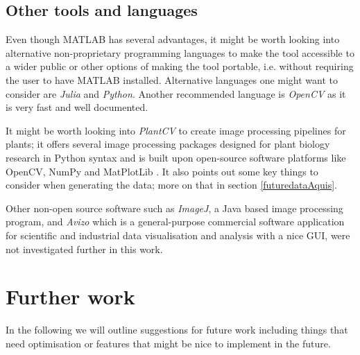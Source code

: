 

\subsection{Other tools and languages}

Even though MATLAB has several advantages, it might be worth looking into alternative non-proprietary programming languages to make the tool accessible to a wider public or other options of making the tool portable, i.e. without requiring the user to have MATLAB installed.
Alternative languages one might want to consider are \textit{Julia} and \textit{Python}. Another recommended language is \textit{OpenCV} as it is very fast and well documented.

It might be worth looking into \textit{PlantCV} to create image processing pipelines for plants; it offers several image processing packages designed for plant biology research in Python syntax and is built upon open-source software platforms like OpenCV, NumPy and MatPlotLib \cite{plantCV}. It also points out some key things to consider when generating the data; more on that in section \ref{futuredataAquis}.

Other non-open source software such as \textit{ImageJ}, a Java based image processing program, and \textit{Avizo} which is a general-purpose commercial software application for scientific and industrial data visualisation and analysis with a nice GUI, were not investigated further in this work. 

 
\section{Further work}

In the following we will outline suggestions for future work including things that need optimisation or features that might be nice to implement in the future. 

%


